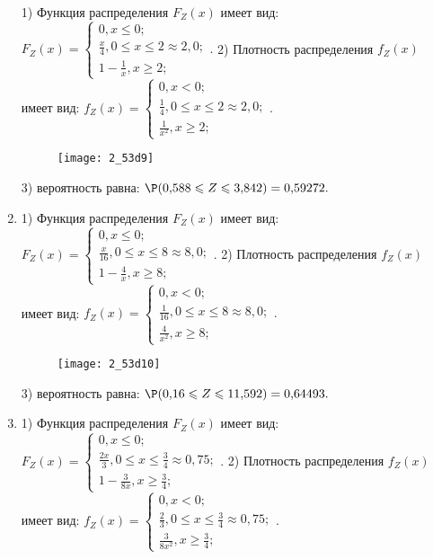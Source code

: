 \documentclass[a4paper,12pt]{article}
\begin{document}
\begin{enumerate}
1) Функция распределения $F_Z(x)$ имеет вид:
$
F_Z(x)=\left\{
\begin{array}{l}
0, x\leqslant 0;\\
\frac{x}{4}, 0\leqslant x\leqslant 2\approx 2,\!0;\\
1 - \frac{1}{x}, x\geqslant2;
\end{array}.
\right.
$
2) Плотность распределения $f_Z(x)$ имеет вид:
$
f_Z(x)=\left\{
\begin{array}{l}
0, x<0;\\
\frac{1}{4}, 0\leqslant x\leqslant 2\approx 2,\!0;\\
\frac{1}{x^{2}}, x\geqslant2;
\end{array}.
\right.
$


\begin{figure}[H]
    \texttt{[image: 2\_53d9]}
\end{figure}


3) вероятность равна:
$
\P(0,\!588\leqslant Z\leqslant 3,\!842)=
0,\!59272.
$



\item


1) Функция распределения $F_Z(x)$ имеет вид:
$
F_Z(x)=\left\{
\begin{array}{l}
0, x\leqslant 0;\\
\frac{x}{16}, 0\leqslant x\leqslant 8\approx 8,\!0;\\
1 - \frac{4}{x}, x\geqslant8;
\end{array}.
\right.
$
2) Плотность распределения $f_Z(x)$ имеет вид:
$
f_Z(x)=\left\{
\begin{array}{l}
0, x<0;\\
\frac{1}{16}, 0\leqslant x\leqslant 8\approx 8,\!0;\\
\frac{4}{x^{2}}, x\geqslant8;
\end{array}.
\right.
$


\begin{figure}[H]
    \texttt{[image: 2\_53d10]}
\end{figure}


3) вероятность равна:
$
\P(0,\!16\leqslant Z\leqslant 11,\!592)=
0,\!64493.
$



\item


1) Функция распределения $F_Z(x)$ имеет вид:
$
F_Z(x)=\left\{
\begin{array}{l}
0, x\leqslant 0;\\
\frac{2 x}{3}, 0\leqslant x\leqslant \frac{3}{4}\approx 0,\!75;\\
1 - \frac{3}{8 x}, x\geqslant\frac{3}{4};
\end{array}.
\right.
$
2) Плотность распределения $f_Z(x)$ имеет вид:
$
f_Z(x)=\left\{
\begin{array}{l}
0, x<0;\\
\frac{2}{3}, 0\leqslant x\leqslant \frac{3}{4}\approx 0,\!75;\\
\frac{3}{8 x^{2}}, x\geqslant\frac{3}{4};
\end{array}.
\right.
$



\end{enumerate}
\end{document}
